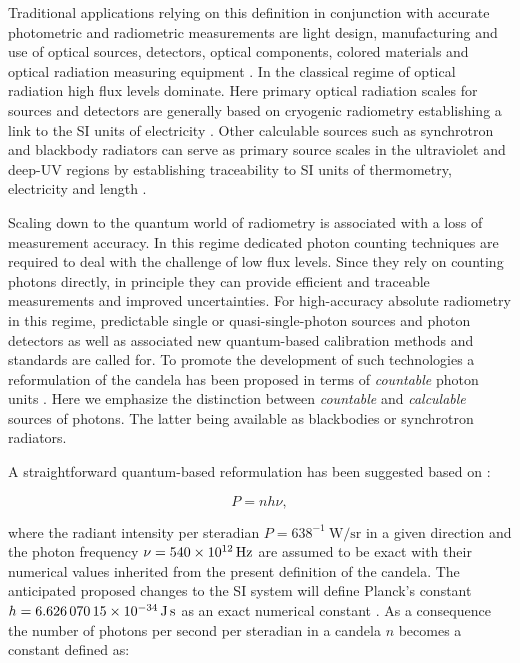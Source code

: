 		Traditional applications relying on this definition in conjunction with accurate photometric and radiometric measurements are light design, manufacturing and use of optical sources, detectors, optical components, colored materials and optical radiation measuring equipment \cite{zwinkels2010photometry}. In the classical regime of optical radiation high flux levels dominate. Here primary optical radiation scales for sources and detectors are generally based on cryogenic radiometry establishing a link to the SI units of electricity \cite{fox20052}. Other calculable sources such as synchrotron and blackbody radiators can serve as primary source scales in the ultraviolet and deep-UV regions by establishing traceability to SI units of thermometry, electricity and length \cite{zwinkels2010photometry, Cheung2007}.

		Scaling down to the quantum world of radiometry is associated with a loss of measurement accuracy. In this regime dedicated photon counting techniques are required to deal with the challenge of low flux levels. Since they rely on counting photons directly, in principle they can provide efficient and traceable measurements and improved uncertainties. For high-accuracy absolute radiometry in this regime, predictable single or quasi-single-photon sources and photon detectors as well as associated new quantum-based calibration methods and standards are called for. To promote the development of such technologies a reformulation of the candela has been proposed in terms of \emph{countable} photon units \cite{zwinkels2010photometry, Cheung2007, SIHighlights2017, QuCandelaProject}. Here we emphasize the distinction between \emph{countable} and \emph{calculable} sources of photons. The latter being available as blackbodies or synchrotron radiators.

		A straightforward quantum-based reformulation has been suggested based on \cite{Cheung2007, zwinkels2010photometry}:

		\begin{equation}
			P = n h \nu,
		\end{equation}

		where the radiant intensity per steradian $P = 638^{-1} \SI{}{\watt\per\steradian}$ in a given direction and the photon frequency $\nu = \SI{540d12}{\hertz}$ are assumed to be exact with their numerical values inherited from the present definition of the candela. The anticipated proposed changes to the SI system will define Planck's constant $h = \SI{6.62607015d-34}{\joule\second}$ as an exact numerical constant \cite{SIproposal}. As a consequence the number of photons per second per steradian in a candela $n$ becomes a constant defined as:

